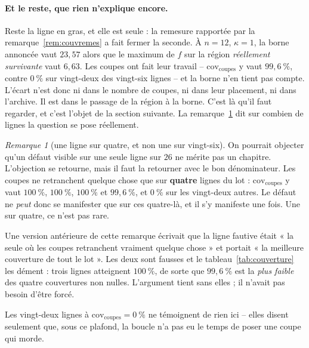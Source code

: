 \documentclass[11pt,a4paper]{article}
\theoremstyle{plain}
\theoremstyle{remark}
\newtheorem{remark}{Remarque}
\begin{document}
\paragraph{Et le reste, que rien n'explique encore.} Reste la ligne en gras,
et elle est seule : la remesure rapportée par la remarque~\ref{rem:couvremes}
a fait fermer la seconde. À $n=12$, $\kappa=1$, la borne annoncée vaut
$23{,}57$ alors que
le maximum de $f$ sur la région \emph{réellement survivante} vaut $6{,}63$.
Les coupes ont fait leur travail -- $\text{cov}_{\text{coupes}}$ y vaut
$99{,}6\ \%$, contre $0\ \%$ sur vingt-deux des vingt-six lignes -- et la
borne n'en tient pas compte. L'écart n'est donc ni dans le nombre de
coupes, ni dans leur placement, ni dans l'archive. Il est dans le passage de
la région à la borne. C'est là qu'il faut regarder, et c'est l'objet de la
section suivante. La remarque~\ref{rem:unesur4} dit sur combien de lignes
la question se pose réellement.

\begin{remark}[une ligne sur quatre, et non une sur vingt-six]
\label{rem:unesur4}
On pourrait objecter qu'un défaut visible sur une seule ligne sur $26$ ne
mérite pas un chapitre. L'objection se retourne, mais il faut la retourner
avec le bon dénominateur. Les coupes ne retranchent quelque chose que sur
\textbf{quatre} lignes du lot : $\text{cov}_{\text{coupes}}$ y vaut
$100\ \%$, $100\ \%$, $100\ \%$ et $99{,}6\ \%$, et $0\ \%$ sur les
vingt-deux autres. Le défaut ne \emph{peut} donc se manifester que sur ces
quatre-là, et il s'y manifeste une fois. Une sur quatre, ce n'est pas rare.

Une version antérieure de cette remarque écrivait que la ligne fautive
était « la seule où les coupes retranchent vraiment quelque chose » et
portait « la meilleure couverture de tout le lot ». Les deux sont fausses
et le tableau~\ref{tab:couverture} les dément : trois lignes atteignent
$100\ \%$, de sorte que $99{,}6\ \%$ est la \emph{plus faible} des quatre
couvertures non nulles. L'argument tient sans elles ; il n'avait pas besoin
d'être forcé.

Les vingt-deux lignes à $\text{cov}_{\text{coupes}}=0\ \%$ ne témoignent de
rien ici -- elles disent seulement que, sous ce plafond, la boucle n'a pas
eu le temps de poser une coupe qui morde.
\end{remark}

\end{document}
